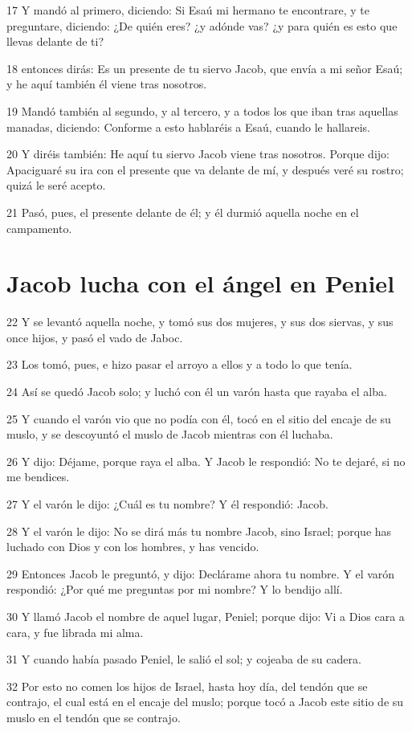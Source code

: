 \par 17 Y mandó al primero, diciendo: Si Esaú mi hermano te encontrare, y te preguntare, diciendo: ¿De quién eres? ¿y adónde vas? ¿y para quién es esto que llevas delante de ti?
\par 18 entonces dirás: Es un presente de tu siervo Jacob, que envía a mi señor Esaú; y he aquí también él viene tras nosotros.
\par 19 Mandó también al segundo, y al tercero, y a todos los que iban tras aquellas manadas, diciendo: Conforme a esto hablaréis a Esaú, cuando le hallareis.
\par 20 Y diréis también: He aquí tu siervo Jacob viene tras nosotros. Porque dijo: Apaciguaré su ira con el presente que va delante de mí, y después veré su rostro; quizá le seré acepto.
\par 21 Pasó, pues, el presente delante de él; y él durmió aquella noche en el campamento.

\section*{Jacob lucha con el ángel en Peniel}

\par 22 Y se levantó aquella noche, y tomó sus dos mujeres, y sus dos siervas, y sus once hijos, y pasó el vado de Jaboc.
\par 23 Los tomó, pues, e hizo pasar el arroyo a ellos y a todo lo que tenía.
\par 24 Así se quedó Jacob solo; y luchó con él un varón hasta que rayaba el alba.
\par 25 Y cuando el varón vio que no podía con él, tocó en el sitio del encaje de su muslo, y se descoyuntó el muslo de Jacob mientras con él luchaba.
\par 26 Y dijo: Déjame, porque raya el alba. Y Jacob le respondió: No te dejaré, si no me bendices.
\par 27 Y el varón le dijo: ¿Cuál es tu nombre? Y él respondió: Jacob.
\par 28 Y el varón le dijo: No se dirá más tu nombre Jacob, sino Israel; porque has luchado con Dios y con los hombres, y has vencido.
\par 29 Entonces Jacob le preguntó, y dijo: Declárame ahora tu nombre. Y el varón respondió: ¿Por qué me preguntas por mi nombre? Y lo bendijo allí.
\par 30 Y llamó Jacob el nombre de aquel lugar, Peniel; porque dijo: Vi a Dios cara a cara, y fue librada mi alma.
\par 31 Y cuando había pasado Peniel, le salió el sol; y cojeaba de su cadera.
\par 32 Por esto no comen los hijos de Israel, hasta hoy día, del tendón que se contrajo, el cual está en el encaje del muslo; porque tocó a Jacob este sitio de su muslo en el tendón que se contrajo.

